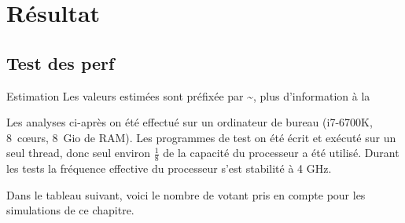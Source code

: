 \documentclass[../report]{subfiles}
\begin{document}
\part{Résultat}

\chapter{Test des perf}


\begin{nota}{Estimation}
	Les valeurs estimées sont préfixée par \textasciitilde{}, plus d'information à la 
\end{nota}

Les analyses ci-après on été effectué sur un ordinateur de bureau (i7-6700K, 8~cœurs, 8~Gio de RAM).
Les programmes de test on été écrit et exécuté sur un seul thread, donc seul environ $\frac{1}{8}$ de 
la capacité du processeur a été utilisé.
Durant les tests la fréquence effective du processeur s'est stabilité à 4 GHz.

Dans le tableau suivant, voici le nombre de votant pris en compte pour les simulations de ce chapitre.
\end{document}
